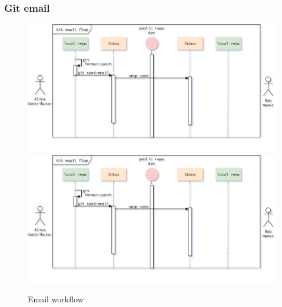 \begin{frame}[noframenumbering]
    \frametitle{Git email}
    \addtocounter{page}{-1}
    \begin{figure}
        \begin{center}
            {
                \includegraphics[height=0.7\textheight,keepaspectratio]{./images/EmailWorkflow_SendFirstPatch.png}
            }
            {
                \includegraphics[height=0.75\textheight,keepaspectratio]{./images/EmailWorkflow_SendFirstPatch.png}
            }
            \caption{Email workflow}
        \end{center}
    \end{figure}
\end{frame}

